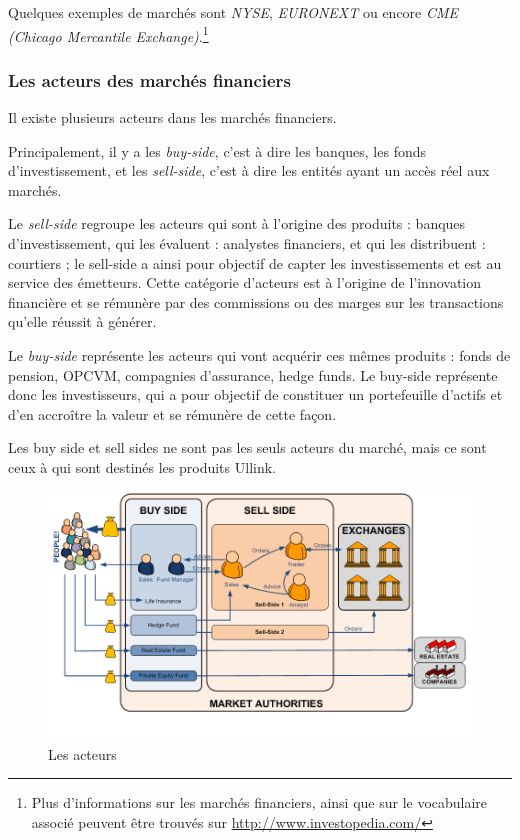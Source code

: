 \documentclass[a4paper, 12pt]{article}
\begin{document}
Quelques exemples de marchés sont \emph{NYSE}, \emph{EURONEXT} ou encore \emph{CME (Chicago Mercantile Exchange)}.\footnote{Plus d'informations sur les marchés financiers, ainsi que sur le vocabulaire associé peuvent être trouvés sur \url{http://www.investopedia.com/}}

\subsubsection{Les acteurs des marchés financiers}

Il existe plusieurs acteurs dans les marchés financiers.

Principalement, il y a les \emph{buy-side}, c’est à dire les banques, les fonds d’investissement, et les \emph{sell-side}, c'est à dire les entités ayant un accès réel aux marchés.

Le \emph{sell-side} regroupe les acteurs qui sont à l'origine des produits : banques d'investissement, qui les évaluent : analystes financiers, et qui les distribuent : courtiers ; le sell-side a ainsi pour objectif de capter les investissements et est au service des émetteurs. Cette catégorie d'acteurs est à l'origine de l'innovation financière et se rémunère par des commissions ou des marges sur les transactions qu'elle réussit à générer.

Le \emph{buy-side} représente les acteurs qui vont acquérir ces mêmes produits : fonds de pension, OPCVM, compagnies d'assurance, hedge funds. Le buy-side représente donc les investisseurs, qui a pour objectif de constituer un portefeuille d'actifs et d'en accroître la valeur et se rémunère de cette façon.

Les buy side et sell sides ne sont pas les seuls acteurs du marché, mais ce sont ceux à qui sont destinés les produits Ullink.

\begin{figure}
\includegraphics[width=\textwidth]{market_actors.png}
\caption{Les acteurs}
\label{market_actors}
\end{figure}
\end{document}
